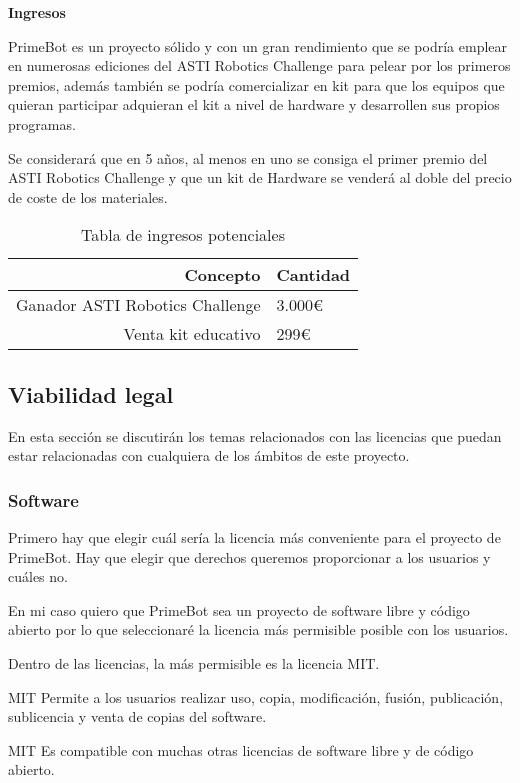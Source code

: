 \textbf{Ingresos}

PrimeBot es un proyecto sólido y con un gran rendimiento que se podría emplear en numerosas ediciones del ASTI Robotics Challenge para pelear por los primeros premios, además también se podría comercializar en kit para que los equipos que quieran participar adquieran el kit a nivel de hardware y desarrollen sus propios programas.

Se considerará que en 5 años, al menos en uno se consiga el primer premio del ASTI Robotics Challenge y que un kit de Hardware se venderá al doble del precio de coste de los materiales. 
 \begin{table}[h]
\begin{tabular}{| r | l |}
\hline
Concepto & Cantidad \\
\hline
Ganador ASTI Robotics Challenge & 3.000€ \\
\hline
Venta kit educativo & 299€ \\
\hline
\end{tabular}
   \caption{Tabla de ingresos potenciales}
   \label{A.7}
 \end{table}
 
\subsection{Viabilidad legal}

En esta sección se discutirán los temas relacionados con las licencias que puedan estar relacionadas con cualquiera de los ámbitos de este proyecto.

\subsubsection{Software}

Primero hay que elegir cuál sería la licencia más conveniente para el proyecto de PrimeBot.
Hay que elegir que derechos queremos proporcionar a los usuarios y cuáles no.

En mi caso quiero que PrimeBot sea un proyecto de software libre y código abierto por lo que seleccionaré la licencia más permisible posible con los usuarios.

Dentro de las licencias, la más permisible es la licencia MIT.

MIT Permite a los usuarios realizar uso, copia, modificación, fusión, publicación, sublicencia y venta de copias del software.

MIT Es compatible con muchas otras licencias de software libre y de código abierto.

